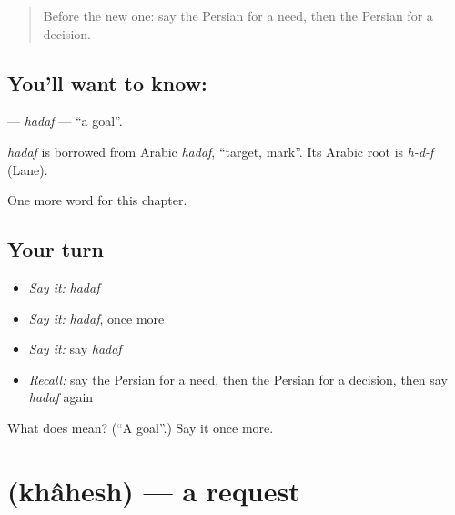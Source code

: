 \label{lesson:FA-C91-hadaf}



\begin{quote}
Before the new one: say the Persian for a need, then the Persian for a decision.
\end{quote}

\subsection*{You'll want to know: }
\textbf{} — \emph{hadaf} — \textquotedblleft{}a goal\textquotedblright{}.

\begin{cousinweb}
\emph{hadaf} is borrowed from Arabic \emph{hadaf}, \textquotedblleft{}target, mark\textquotedblright{}. Its Arabic root is \emph{h-d-f} (Lane).
\end{cousinweb}

\begin{grammarlens}[title={What you've built}]
One more word for this chapter.
\end{grammarlens}

\subsection*{Your turn}
\begin{itemize}
\raggedright
  \item \emph{Say it:} \emph{hadaf}
  \item \emph{Say it:} \emph{hadaf}, once more
  \item \emph{Say it:} say \emph{hadaf}
  \item \emph{Recall:} say the Persian for a need, then the Persian for a decision, then say \emph{hadaf} again
\end{itemize}

\begin{tcolorbox}[breakable,colback=teal!4,colframe=teal!35!black,title={Before you move on}]
What does  mean? (\textquotedblleft{}A goal\textquotedblright{}.) Say it once more.
\end{tcolorbox}
\section[\texorpdfstring{\fa{خواهش} (khâhesh)}{خواهش (khâhesh)}]{ (khâhesh) — a request}

\label{lesson:FA-C91-khahesh}



